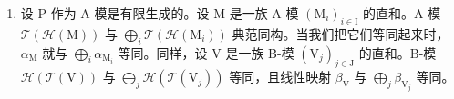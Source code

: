 \begin{enumerate}
\def\labelenumi{\arabic{enumi})}
\setcounter{enumi}{2}
\tightlist
\item
  设 P 作为 A-模是有限生成的。设 M 是一族 A-模 \((\mathrm{M}_{i})_{i\in\mathrm{I}}\) 的直和。A-模 \(\mathcal{T}(\mathcal{H}(\mathrm{M}))\) 与 \(\bigoplus_{i}\mathcal{T}(\mathcal{H}(\mathrm{M}_{i}))\) 典范同构。当我们把它们等同起来时，\(\alpha_{\mathrm{M}}\) 就与 \(\bigoplus_{i}\alpha_{\mathrm{M}_{i}}\) 等同。同样，设 V 是一族 B-模 \((\mathrm{V}_j)_{j\in \mathrm{J}}\) 的直和。B-模 \(\mathcal{H}(\mathcal{T}(\mathrm{V}))\) 与 \(\bigoplus_{j}\mathcal{H}(\mathcal{T}(\mathrm{V}_{j}))\) 等同，且线性映射 \(\beta_{\mathrm{V}}\) 与 \(\bigoplus_{j}\beta_{\mathrm{V}_{j}}\) 等同。
\end{enumerate}

